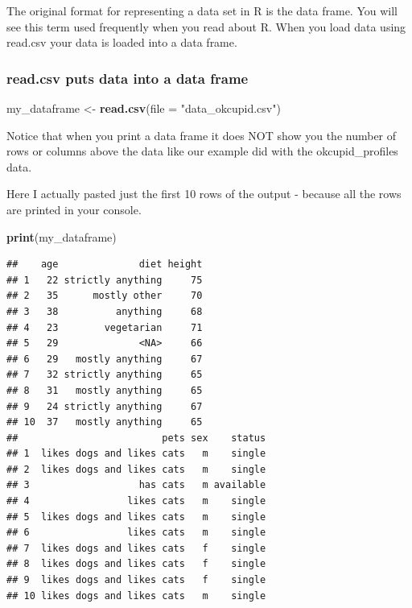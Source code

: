 \documentclass[
]{krantz}
\makeatletter
\newenvironment{Shaded}{\begin{snugshade}}{\end{snugshade}}
\newcommand{\DataTypeTok}[1]{\textcolor[rgb]{0.27,0.27,0.27}{#1}}
\newcommand{\KeywordTok}[1]{\textcolor[rgb]{0.27,0.27,0.27}{\textbf{#1}}}
\newcommand{\NormalTok}[1]{#1}
\newcommand{\StringTok}[1]{\textcolor[rgb]{0.5,0.5,0.5}{#1}}
\newenvironment{kframe}{%
\medskip{}
\setlength{\fboxsep}{.8em}
 \def\at@end@of@kframe{}%
 \ifinner\ifhmode%
  \def\at@end@of@kframe{\end{minipage}}%
  \begin{minipage}{\columnwidth}%
 \fi\fi%
 \def\FrameCommand##1{\hskip\@totalleftmargin \hskip-\fboxsep
 \colorbox{shadecolor}{##1}\hskip-\fboxsep
     \hskip-\linewidth \hskip-\@totalleftmargin \hskip\columnwidth}%
 \MakeFramed {\advance\hsize-\width
   \@totalleftmargin\z@ \linewidth\hsize
   \@setminipage}}%
 {\par\unskip\endMakeFramed%
 \at@end@of@kframe}
\renewenvironment{Shaded}{\begin{kframe}}{\end{kframe}}
\makeatother
\begin{document}
The original format for representing a data set in R is the data frame. You will see this term used frequently when you read about R. When you load data using read.csv your data is loaded into a data frame.

\hypertarget{read.csv-puts-data-into-a-data-frame}{%
\subsubsection{read.csv puts data into a data frame}\label{read.csv-puts-data-into-a-data-frame}}

\begin{Shaded}
\begin{Highlighting}[]
\NormalTok{my_dataframe <-}\StringTok{ }\KeywordTok{read.csv}\NormalTok{(}\DataTypeTok{file =} \StringTok{"data_okcupid.csv"}\NormalTok{)}
\end{Highlighting}
\end{Shaded}

Notice that when you print a data frame it does NOT show you the number of rows or columns above the data like our example did with the okcupid\_profiles data.

Here I actually pasted just the first 10 rows of the output - because all the rows are printed in your console.

\begin{Shaded}
\begin{Highlighting}[]
\KeywordTok{print}\NormalTok{(my_dataframe)}
\end{Highlighting}
\end{Shaded}

\begin{verbatim}
##    age              diet height
## 1   22 strictly anything     75
## 2   35      mostly other     70
## 3   38          anything     68
## 4   23        vegetarian     71
## 5   29              <NA>     66
## 6   29   mostly anything     67
## 7   32 strictly anything     65
## 8   31   mostly anything     65
## 9   24 strictly anything     67
## 10  37   mostly anything     65
##                         pets sex    status
## 1  likes dogs and likes cats   m    single
## 2  likes dogs and likes cats   m    single
## 3                   has cats   m available
## 4                 likes cats   m    single
## 5  likes dogs and likes cats   m    single
## 6                 likes cats   m    single
## 7  likes dogs and likes cats   f    single
## 8  likes dogs and likes cats   f    single
## 9  likes dogs and likes cats   f    single
## 10 likes dogs and likes cats   m    single
\end{verbatim}
\end{document}
